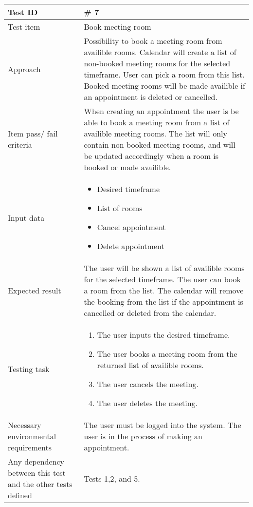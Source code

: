 \documentclass[a4paper, 10pt]{article}
\begin{document}
\begin{tabularx}{\textwidth}{ |X|X| }
\hline
\rowcolor{Gray}
Test ID & \# 7 \\ \hline
Test item & Book meeting room \\ \hline
Approach & Possibility to book a meeting room from availible rooms. Calendar will create a list of non-booked meeting rooms for the selected timeframe. User can pick a room from this list. Booked meeting rooms will be made availible if an appointment is deleted or cancelled.\\ \hline
Item pass/ fail criteria & When creating an appointment the user is be able to book a meeting room from a list of availible meeting rooms. The list will only contain non-booked meeting rooms, and will be updated accordingly when a room is booked or made availible.\\ \hline
Input data &
\begin{itemize}
\item Desired timeframe
\item List of rooms
\item Cancel appointment
\item Delete appointment
\end{itemize}\\ \hline
Expected result &
The user will be shown a list of availible rooms for the selected timeframe. The user can book a room from the list. The calendar will remove the booking from the list if the appointment is cancelled or deleted from the calendar.\\ \hline
Testing task &
\begin{enumerate}
    \item The user inputs the desired timeframe.
    \item The user books a meeting room from the returned list of availible rooms.
    \item The user cancels the meeting.
    \item The user deletes the meeting.
\end{enumerate}\\ \hline
Necessary environmental requirements & The user must be logged into the system. The user is in the process of making an appointment. \\ \hline
Any dependency between this test and the other tests defined & Tests 1,2, and 5. \\ \hline

\end{tabularx}
\end{document}
